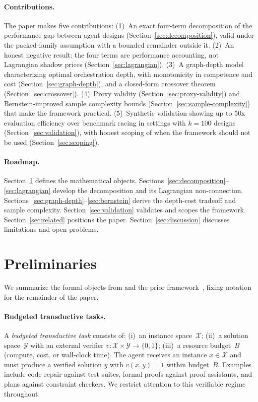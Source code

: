 \documentclass[twoside,11pt]{article}
\newcommand{\cX}{\mathcal{X}}
\newcommand{\cY}{\mathcal{Y}}
\begin{document}
\paragraph{Contributions.}
The paper makes five contributions:
(1)~An exact four-term decomposition of the performance gap between agent designs (Section~\ref{sec:decomposition}), valid under the packed-family assumption with a bounded remainder outside it.
(2)~An honest negative result: the four terms are performance accounting, not Lagrangian shadow prices (Section~\ref{sec:lagrangian}).
(3)~A graph-depth model characterizing optimal orchestration depth, with monotonicity in competence and cost (Section~\ref{sec:graph-depth}), and a closed-form crossover theorem (Section~\ref{sec:crossover}).
(4)~Proxy validity (Section~\ref{sec:proxy-validity}) and Bernstein-improved sample complexity bounds (Section~\ref{sec:sample-complexity}) that make the framework practical.
(5)~Synthetic validation showing up to 50x evaluation efficiency over benchmark racing in settings with $k = 100$ designs (Section~\ref{sec:validation}), with honest scoping of when the framework should not be used (Section~\ref{sec:scoping}).

\paragraph{Roadmap.}
Section~\ref{sec:prelim} defines the mathematical objects.
Sections~\ref{sec:decomposition}--\ref{sec:lagrangian} develop the decomposition and its Lagrangian non-connection.
Sections~\ref{sec:graph-depth}--\ref{sec:bernstein} derive the depth-cost tradeoff and sample complexity.
Section~\ref{sec:validation} validates and scopes the framework.
Section~\ref{sec:related} positions the paper.
Section~\ref{sec:discussion} discusses limitations and open problems.
\section{Preliminaries}
\label{sec:prelim}

We summarize the formal objects from \citet{achille2025agents} and the prior framework~\citep{beneventano2026framework}, fixing notation for the remainder of the paper.

\paragraph{Budgeted transductive tasks.}
A \emph{budgeted transductive task} consists of:
(i)~an instance space~$\cX$;
(ii)~a solution space~$\cY$ with an external verifier $v\colon \cX \times \cY \to \{0,1\}$;
(iii)~a resource budget~$B$ (compute, cost, or wall-clock time).
The agent receives an instance $x \in \cX$ and must produce a verified solution $y$ with $v(x,y) = 1$ within budget~$B$.
Examples include code repair against test suites, formal proofs against proof assistants, and plans against constraint checkers.
We restrict attention to this verifiable regime throughout.
\end{document}
